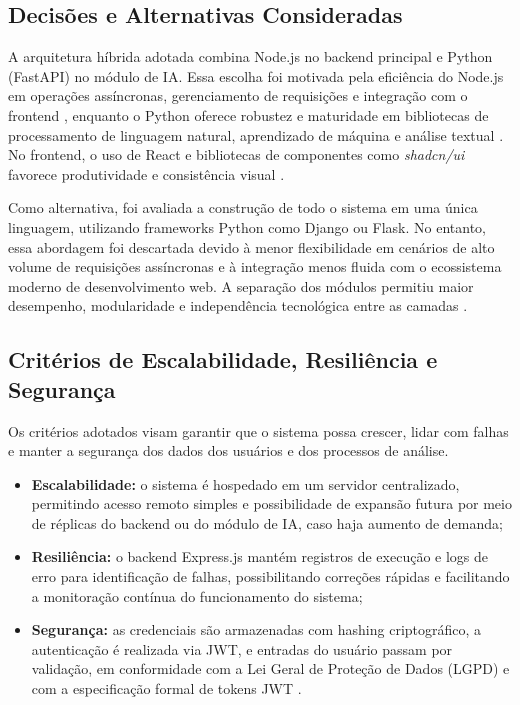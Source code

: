 \subsection{Decisões e Alternativas Consideradas}

A arquitetura híbrida adotada combina Node.js no backend principal e Python (FastAPI) no módulo de IA. Essa escolha foi motivada pela eficiência do Node.js em operações assíncronas, gerenciamento de requisições e integração com o frontend \cite{nodejs_docs_2024}, enquanto o Python oferece robustez e maturidade em bibliotecas de processamento de linguagem natural, aprendizado de máquina e análise textual \cite{python_docs_2024, pandas_docs_2024}. No frontend, o uso de React e bibliotecas de componentes como \textit{shadcn/ui} favorece produtividade e consistência visual \cite{react_docs_2024, shadcn_docs_2024}.

Como alternativa, foi avaliada a construção de todo o sistema em uma única linguagem, utilizando frameworks Python como Django ou Flask. No entanto, essa abordagem foi descartada devido à menor flexibilidade em cenários de alto volume de requisições assíncronas e à integração menos fluida com o ecossistema moderno de desenvolvimento web. A separação dos módulos permitiu maior desempenho, modularidade e independência tecnológica entre as camadas \cite{bass_software_architecture_2012}.


\subsection{Critérios de Escalabilidade, Resiliência e Segurança}

Os critérios adotados visam garantir que o sistema possa crescer, lidar com falhas e manter a segurança dos dados dos usuários e dos processos de análise.

\begin{itemize}
    \item \textbf{Escalabilidade:} o sistema é hospedado em um servidor centralizado, permitindo acesso remoto simples e possibilidade de expansão futura por meio de réplicas do backend ou do módulo de IA, caso haja aumento de demanda;
    
    \item \textbf{Resiliência:} o backend Express.js mantém registros de execução e logs de erro para identificação de falhas, possibilitando correções rápidas e facilitando a monitoração contínua do funcionamento do sistema;
    
    \item \textbf{Segurança:} as credenciais são armazenadas com hashing criptográfico, a autenticação é realizada via JWT, e entradas do usuário passam por validação, em conformidade com a Lei Geral de Proteção de Dados (LGPD) \cite{brasil_lei_13709_2018} e com a especificação formal de tokens JWT \cite{jwt_rfc7519_2015}.
\end{itemize}


